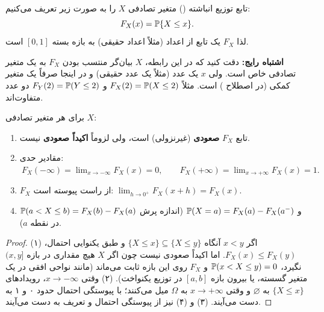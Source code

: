 \begin{definition}
تابع توزیع انباشته () متغیر تصادفی $X$ را به صورت زیر تعریف می‌کنیم:
\[
F_X(x)=\mathbb{P}\{X\le x\}.
\]
لذا $F_X$ یک تابع از اعداد (مثلاً اعداد حقیقی) به بازه بسته $[0,1]$ است.
\end{definition}

\begin{warning}
\warntitle \textbf{اشتباه رایج:} دقت کنید که در این رابطه، $X$ بیان‌گر منتسب بودن $F_X$ به یک متغیر تصادفی خاص است. ولی $x$ یک عدد (مثلاً یک عدد حقیقی) و در اینجا صرفاً یک متغیر کمکی (در اصطلاح ) است. مثلاً $F_X(2)=\mathbb{P}(X\le2)$ و $F_Y(2)=\mathbb{P}(Y\le2)$ دو عدد متفاوت‌اند.
\end{warning}

\begin{theorem}
برای هر متغیر تصادفی $X$:
\begin{enumerate}
\item تابع $F_X$ \textbf{صعودی} (غیرنزولی) است، ولی لزوماً \textbf{اکیداً صعودی} نیست.
\item مقادیر حدی:
$\ F_X(-\infty)=\lim_{x\to-\infty}F_X(x)=0,\qquad F_X(+\infty)=\lim_{x\to+\infty}F_X(x)=1 .$
\item $F_X$ از راست پیوسته است: $\lim_{h\to0^+}F_X(x+h)=F_X(x)$.
\item $\mathbb{P}(a<X\le b)=F_X(b)-F_X(a)$ و $\mathbb{P}(X=a)=F_X(a)-F_X(a^-)$ (اندازه پرش در نقطه $a$).
\end{enumerate}
\end{theorem}
\begin{proof}
(۱) اگر $x<y$ آنگاه $\{X\le x\}\subseteq\{X\le y\}$ و طبق یکنوایی احتمال، $F_X(x)\le F_X(y)$. اما اکیداً صعودی نیست چون اگر $X$ هیچ مقداری در بازه $(x,y]$ نگیرد، $\mathbb{P}(x<X\le y)=0$ و $F_X$ روی این بازه ثابت می‌ماند (مانند نواحی افقی در  یک متغیر گسسته، یا بیرون بازه $[a,b]$ در توزیع یکنواخت).
(۲) وقتی $x\to-\infty$، رویدادهای $\{X\le x\}$ به $\varnothing$ و وقتی $x\to+\infty$ به $\Omega$ میل می‌کنند؛ با پیوستگی احتمال حدود ۰ و ۱ به دست می‌آیند.
(۳) و (۴) نیز از پیوستگی احتمال و تعریف به دست می‌آیند.
\end{proof}


